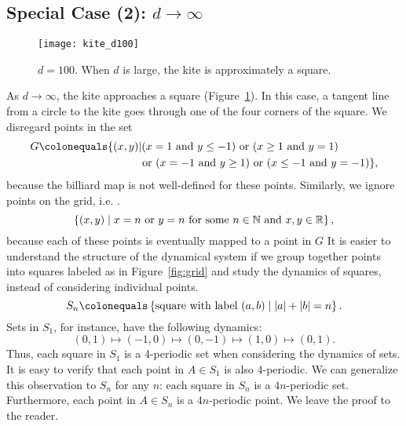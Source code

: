 \documentclass[10pt,twoside,draft]{book}
\begin{document}
\subsection*{Special Case (2): $d \to \infty$}
\begin{figure}[ht]
  \begin{center}
    \texttt{[image: kite\_d100]}
    \caption{$d = 100$. When $d$ is large, the kite is approximately a square.}
    \label{fig:kite-square}
  \end{center}
\end{figure}
As $d \to \infty$, the kite approaches a square (Figure~\ref{fig:kite-square}).
In this case, a tangent line from a circle to the kite goes through one of the four corners of the square.
We disregard points in the set 
\begin{align*}
  G \ceq \{(x,y) &|
    (x = 1 \mbox{ and } y \leq -1) 
    \mbox{ or }
    (x \geq 1 \mbox{ and } y = 1)  \\
    &\mbox{ or }
    (x = -1 \mbox{ and } y \geq 1) 
    \mbox{ or }
    (x \leq -1 \mbox{ and } y = -1) 
  \},
\end{align*}
 because the billiard map is not well-defined for these points.
Similarly, we ignore points on the grid, i.e. .
\begin{equation*}
  \left \{ (x,y) \mathrel{} \middle| \mathrel{} x = n \mbox{ or } y = n \mbox{ for some } n \in \mathbb{N} \mbox{ and } x,y \in \mathbb{R} \right \},
\end{equation*}
because each of these points is eventually mapped to a point in $G$
It is easier to understand the structure of the dynamical system if we group together points into squares labeled as in Figure~\ref{fig:grid} and study the dynamics of squares, instead of considering individual points.
\begin{equation*}
  S_n \ceq \setst{\mbox{square with label } (a,b)}{\abs{a} + \abs{b} = n}.
\end{equation*}
Sets in $S_1$, for instance, have the following dynamics:
\begin{equation*}
  (0,1) \mapsto (-1,0) \mapsto (0,-1) \mapsto (1,0) \mapsto (0,1).
\end{equation*}
Thus, each square in $S_1$ is a 4-periodic set when considering the dynamics of sets.
It is easy to verify that each point in $A \in S_1$ is also $4$-periodic.
We can generalize this observation to $S_n$ for any $n$: each square in $S_n$ is a $4n$-periodic set.
Furthermore, each point in $A \in S_n$ is a $4n$-periodic point.
We leave the proof to the reader.
\end{document}
